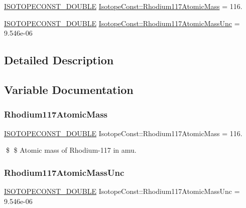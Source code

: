 \begin{DoxyCompactItemize}
\item 
\mbox{\hyperlink{group___isotope_const-_macros_ga8f45a7272ce02c0b4c65c44636ed719a}{I\+S\+O\+T\+O\+P\+E\+C\+O\+N\+S\+T\+\_\+\+D\+O\+U\+B\+LE}} \mbox{\hyperlink{group___isotope_const-_rhodium-_rh117_gaf94c73793e7f3674fe08897cd0e31747}{Isotope\+Const\+::\+Rhodium117\+Atomic\+Mass}} = 116.
\item 
\mbox{\hyperlink{group___isotope_const-_macros_ga8f45a7272ce02c0b4c65c44636ed719a}{I\+S\+O\+T\+O\+P\+E\+C\+O\+N\+S\+T\+\_\+\+D\+O\+U\+B\+LE}} \mbox{\hyperlink{group___isotope_const-_rhodium-_rh117_ga269218723a2fe735fcb2fddb2d5245b5}{Isotope\+Const\+::\+Rhodium117\+Atomic\+Mass\+Unc}} = 9.\+546e-\/06
\end{DoxyCompactItemize}


\subsection{Detailed Description}


\subsection{Variable Documentation}
\mbox{\label{group___isotope_const-_rhodium-_rh117_gaf94c73793e7f3674fe08897cd0e31747}} 
\subsubsection{\texorpdfstring{Rhodium117\+Atomic\+Mass}{Rhodium117AtomicMass}}
{\footnotesize\ttfamily \mbox{\hyperlink{group___isotope_const-_macros_ga8f45a7272ce02c0b4c65c44636ed719a}{I\+S\+O\+T\+O\+P\+E\+C\+O\+N\+S\+T\+\_\+\+D\+O\+U\+B\+LE}} Isotope\+Const\+::\+Rhodium117\+Atomic\+Mass = 116.}

\$ \$ Atomic mass of Rhodium-\/117 in amu. \mbox{\label{group___isotope_const-_rhodium-_rh117_ga269218723a2fe735fcb2fddb2d5245b5}} 
\subsubsection{\texorpdfstring{Rhodium117\+Atomic\+Mass\+Unc}{Rhodium117AtomicMassUnc}}
{\footnotesize\ttfamily \mbox{\hyperlink{group___isotope_const-_macros_ga8f45a7272ce02c0b4c65c44636ed719a}{I\+S\+O\+T\+O\+P\+E\+C\+O\+N\+S\+T\+\_\+\+D\+O\+U\+B\+LE}} Isotope\+Const\+::\+Rhodium117\+Atomic\+Mass\+Unc = 9.\+546e-\/06}

